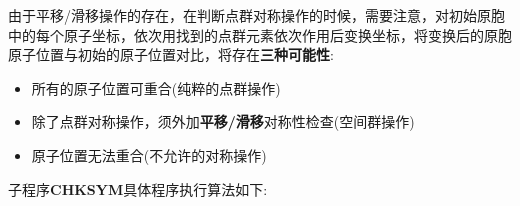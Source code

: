 由于平移/滑移操作的存在，在判断点群对称操作的时候，需要注意，对初始原胞中的每个原子坐标，依次用找到的点群元素依次作用后变换坐标，将变换后的原胞原子位置与初始的原子位置对比，将存在\textbf{三种可能性}:
\begin{itemize}
	\item 所有的原子位置可重合(纯粹的点群操作)
	\item 除了点群对称操作，须外加\textbf{平移/滑移}对称性检查(空间群操作)
	\item 原子位置无法重合(不允许的对称操作)
\end{itemize}
子程序\textbf{CHKSYM}具体程序执行算法如下:
